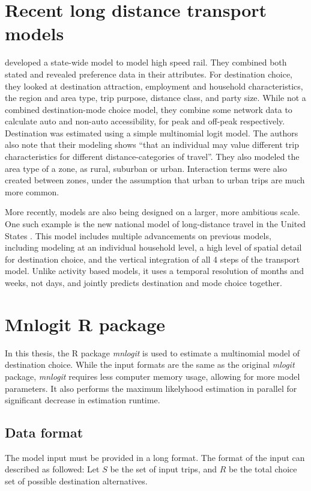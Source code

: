 \section{Recent long distance transport models}
\autocite{Outwater10} developed a state-wide model to model high speed rail. They combined both stated and revealed preference data in their attributes. For destination choice, they looked at destination attraction, employment and household characteristics, the region and area type, trip purpose, distance class, and party size. While not a combined destination-mode choice model, they combine some network data to calculate auto and non-auto accessibility, for peak and off-peak respectively. Destination was estimated using a simple multinomial logit model. The authors also note that their modeling shows \enquote{that an individual may value different trip characteristics for different distance-categories of travel}. They also modeled the area type of a zone, as rural, suburban or urban. Interaction terms were also created between zones, under the assumption that urban to urban trips are much more common.

More recently, models are also being designed on a larger, more ambitious scale. One such example is the new national model of long-distance travel in the United States \parencite{Outwater15}. This model includes multiple advancements on previous models, including modeling at an individual household level, a high level of spatial detail for destination choice, and the vertical integration of all 4 steps of the transport model. Unlike activity based models, it uses a temporal resolution of months and weeks, not days, and jointly predicts destination and mode choice together. 

\section{Mnlogit R package}
\label{section:mnlogit-structure}
\label{section:mnlogit}
In this thesis, the R package \textit{mnlogit} \parencite{hasan2014fast} is used to estimate a multinomial model of destination choice. While the input formats are the same as the original \textit{mlogit} package, \textit{mnlogit} requires less computer memory usage, allowing for more model parameters. It also performs the maximum likelyhood estimation in parallel for significant decrease in estimation runtime.
\subsection*{Data format}
The model input must be provided in a long format. The format of the input can described as followed:
Let \(S\)  be the set of input trips, and \(R\)  be the total choice set of possible destination alternatives. 

